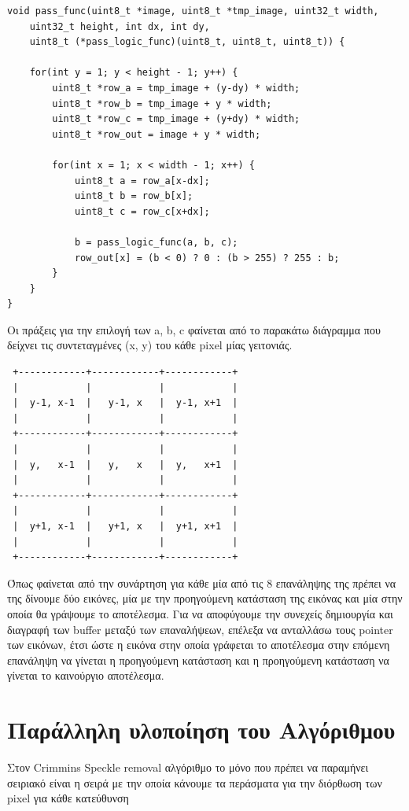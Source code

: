 \documentclass[12pt]{article}
\begin{document}
\newpage

\begin{verbatim}
void pass_func(uint8_t *image, uint8_t *tmp_image, uint32_t width,
    uint32_t height, int dx, int dy,
    uint8_t (*pass_logic_func)(uint8_t, uint8_t, uint8_t)) {

    for(int y = 1; y < height - 1; y++) {
        uint8_t *row_a = tmp_image + (y-dy) * width;
        uint8_t *row_b = tmp_image + y * width;
        uint8_t *row_c = tmp_image + (y+dy) * width;
        uint8_t *row_out = image + y * width;

        for(int x = 1; x < width - 1; x++) {
            uint8_t a = row_a[x-dx];
            uint8_t b = row_b[x];
            uint8_t c = row_c[x+dx];

            b = pass_logic_func(a, b, c);
            row_out[x] = (b < 0) ? 0 : (b > 255) ? 255 : b;
        }
    }
}
\end{verbatim}

Οι πράξεις για την επιλογή των a, b, c φαίνεται από το παρακάτω διάγραμμα που δείχνει τις συντεταγμένες (x, y) του κάθε pixel μίας γειτονιάς.

\vspace{0.3em}
\begin{center}
\begin{varwidth}{0.6\linewidth}
\begin{verbatim}
 +------------+------------+------------+ 
 |            |            |            | 
 |  y-1, x-1  |   y-1, x   |  y-1, x+1  | 
 |            |            |            | 
 +------------+------------+------------+ 
 |            |            |            | 
 |  y,   x-1  |   y,   x   |  y,   x+1  | 
 |            |            |            | 
 +------------+------------+------------+ 
 |            |            |            | 
 |  y+1, x-1  |   y+1, x   |  y+1, x+1  | 
 |            |            |            | 
 +------------+------------+------------+ 
\end{verbatim}
\end{varwidth}
\end{center}

Όπως φαίνεται από την συνάρτηση για κάθε μία από τις 8 επανάληψης της πρέπει να της δίνουμε δύο εικόνες, μία με την προηγούμενη κατάσταση της εικόνας και μία στην οποία θα γράψουμε το αποτέλεσμα. Για να αποφύγουμε την συνεχείς δημιουργία και διαγραφή των buffer μεταξύ των επαναλήψεων, επέλεξα να ανταλλάσω τους pointer των εικόνων, έτσι ώστε η εικόνα στην οποία γράφεται το αποτέλεσμα στην επόμενη επανάληψη να γίνεται η προηγούμενη κατάσταση και η προηγούμενη κατάσταση να γίνεται το καινούργιο αποτέλεσμα.

\newpage

\section{Παράλληλη υλοποίηση του Αλγόριθμου}

Στον Crimmins Speckle removal αλγόριθμο το μόνο που πρέπει να παραμήνει σειριακό είναι η σειρά με την οποία κάνουμε τα περάσματα για την διόρθωση των pixel για κάθε κατεύθυνση 
\end{document}
